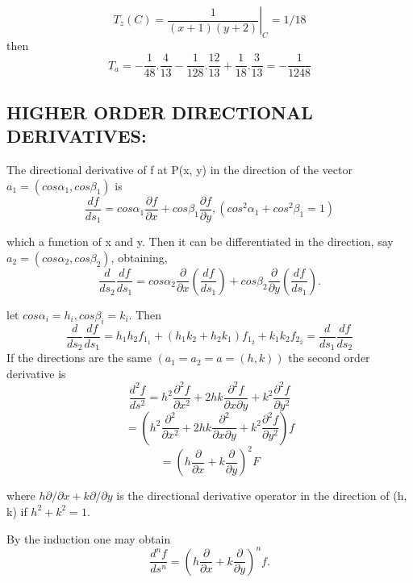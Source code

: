 \documentclass{article}
\begin{document}
$$\left.T_ z(C) = \frac{1}{(x+1)(y+2)}\right\vert_C = 1/18$$
then
$$ T_a = -\frac{1}{48} . \frac{4}{13} - \frac{1}{128} .\frac{12}{13} + \frac{1}{18} .\frac{3}{13} = - \frac{1}{1248}$$
\subsection*{HIGHER ORDER DIRECTIONAL DERIVATIVES: }
The directional derivative of f at P(x, y) in the
direction of the vector\\ $a_1=(cos \alpha_1, cos \beta_1 )$ is 
$$\frac{df}{ds_1} = cos\alpha_1 \frac{\partial f}{\partial x} + cos\beta_1 \frac{\partial f}{\partial y} , (cos^2\alpha_1 + cos^2\beta_1 = 1)$$

which a function of x and y. Then it can be differentiated
in the direction, say $a_2 = (cos \alpha_2 , cos \beta_2)$, obtaining,
$$ \frac{d}{ds_2} \frac{df}{ds_1} = cos\alpha_2 \frac{\partial}{\partial x}(\frac{df}{ds_1}) + cos\beta_2\frac{\partial}{\partial y}(\frac{df}{ds_1}). $$

let $cos\alpha_i = h_i, cos\beta_i = k_i.$ Then\\

$$ \frac{d}{ds_2} \frac{df}{ds_1} = h_1h_2f_1_1 + (h_1k_2 + h_2k_1)f_1_2+k_1k_2f_2_2 = \frac{d}{ds_1}\frac{df}{ds_2} $$
If the directions are the same $(a_1 = a_2 = a = (h,k))$ the second order derivative is
$$\frac{d^2f}{ds^2} = h^2 \frac{\partial^2f}{\partial x^2} + 2hk \frac{\partial^2f}{\partial x\partial y} + k^2 \frac{\partial^2f}{\partial y^2}$$
$$ = (h^2 \frac{\partial^2}{\partial x^2} + 2hk \frac{\partial^2}{\partial x\partial y} + k^2 \frac{\partial^2f}{\partial y^2}) f $$
$$ = (h \frac{\partial}{\partial x} + k \frac{\partial}{\partial y})^2 F$$

where $h\partial/\partial x + k\partial/\partial y$ is the directional derivative operator in the direction of (h, k) if $h^2 + k^2 = 1$.

By the induction one may obtain
$$ \frac{d^nf}{ds^n} = ( h \frac{\partial}{\partial x} + k \frac{\partial}{\partial y})^n f.$$
\end{document}
